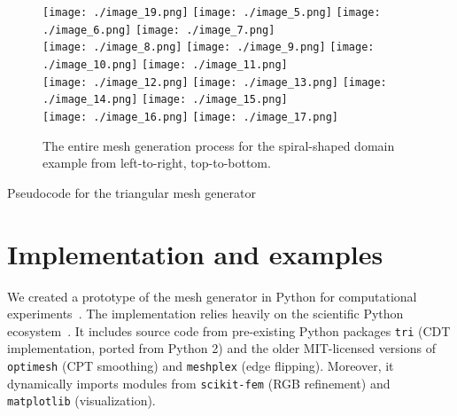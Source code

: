 \documentclass[11pt]{article}
\begin{document}
\begin{figure}[htbp]
  \centering
  \texttt{[image: ./image\_19.png]}
  \texttt{[image: ./image\_5.png]}
  \texttt{[image: ./image\_6.png]}
  \texttt{[image: ./image\_7.png]}\\
  \texttt{[image: ./image\_8.png]}
  \texttt{[image: ./image\_9.png]}
  \texttt{[image: ./image\_10.png]}
  \texttt{[image: ./image\_11.png]}\\
  \texttt{[image: ./image\_12.png]}
  \texttt{[image: ./image\_13.png]}
  \texttt{[image: ./image\_14.png]}
  \texttt{[image: ./image\_15.png]}\\
  \texttt{[image: ./image\_16.png]}
  \texttt{[image: ./image\_17.png]}
  \hspace{0.48\textwidth}
  \caption{The entire mesh generation process for the spiral-shaped domain
    example from left-to-right, top-to-bottom.}
\label{fig:spiralexample}
\end{figure}

\begin{algorithm}[H]
  \caption{Pseudocode for the triangular mesh generator}
  \label{alg:meshgen}
  \begin{algorithmic}[1]
    \Statex
    \EndFor
    \State {}
    \EndFunction
  \end{algorithmic}
\end{algorithm}


\section{Implementation and examples}

We created a prototype of the mesh generator in Python for computational
experiments~\cite{adaptmesh2020}.  The implementation relies heavily on the
scientific Python ecosystem~\cite{virtanen2020scipy}.  It includes source code
from pre-existing Python packages \verb|tri| \cite{tri} (CDT implementation,
ported from Python 2) and the older MIT-licensed versions of \verb|optimesh|
\cite{optimesh} (CPT smoothing) and \verb|meshplex| \cite{meshplex} (edge
flipping).  Moreover, it dynamically imports modules from \verb|scikit-fem|
\cite{gustafsson2020scikit} (RGB refinement) and \verb|matplotlib|
\cite{hunter2007matplotlib} (visualization).
\end{document}
